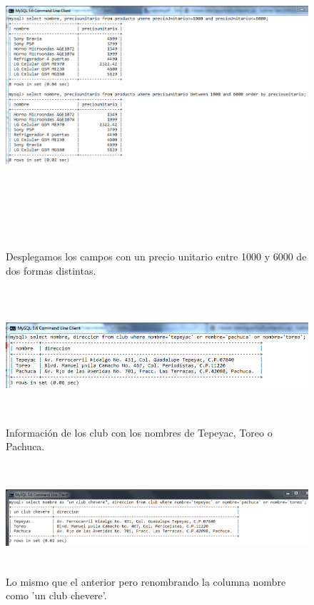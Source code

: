 \documentclass[12pt, titlepage]{article}
\begin{document}
\begin{figure}[H]
    \begin{center}
        \includegraphics[width=15cm, height=12cm]{img/entre.png}
        \caption{Desplegamos los campos con un precio unitario entre 1000 y 6000 de dos formas distintas.}
        \label{fig:arlter3}
    \end{center}
\end{figure}
\begin{figure}[H]
    \begin{center}
        \includegraphics[width=15cm, height=5cm]{img/club.png}
        \caption{Información de los club con los nombres de Tepeyac, Toreo o Pachuca.}
        \label{fig:arlter4}
    \end{center}
\end{figure}
\begin{figure}[H]
    \begin{center}
        \includegraphics[width=15cm, height=4cm]{img/chevere.png}
        \caption{Lo mismo que el anterior pero renombrando la columna nombre como 'un club chevere'.}
        \label{fig:arlter5}
    \end{center}
\end{figure}
\end{document}
